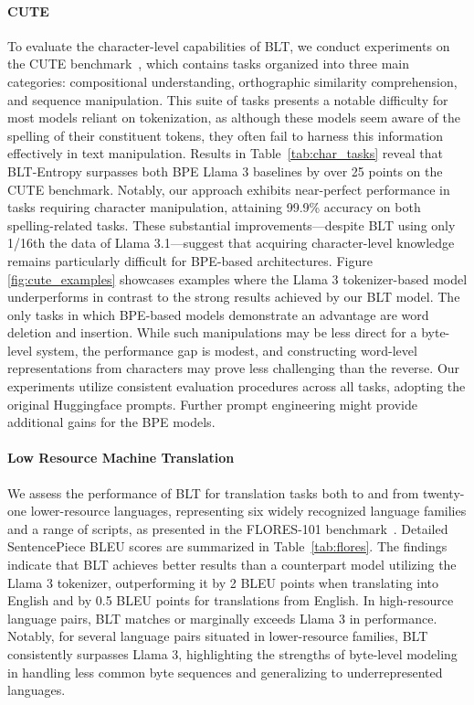 \paragraph{CUTE}
To evaluate the character-level capabilities of {\textsc BLT}, we conduct experiments on the CUTE benchmark~\citep{edman2024cute}, which contains tasks organized into three main categories: compositional understanding, orthographic similarity comprehension, and sequence manipulation. This suite of tasks presents a notable difficulty for most models reliant on tokenization, as although these models seem aware of the spelling of their constituent tokens, they often fail to harness this information effectively in text manipulation. Results in Table~\ref{tab:char_tasks} reveal that {\textsc BLT}-Entropy surpasses both BPE Llama 3 baselines by over 25 points on the CUTE benchmark. Notably, our approach exhibits near-perfect performance in tasks requiring character manipulation, attaining 99.9\% accuracy on both spelling-related tasks. These substantial improvements—despite {\textsc BLT} using only 1/16th the data of Llama 3.1—suggest that acquiring character-level knowledge remains particularly difficult for BPE-based architectures. Figure \ref{fig:cute_examples} showcases examples where the Llama 3 tokenizer-based model underperforms in contrast to the strong results achieved by our {\textsc BLT} model. The only tasks in which BPE-based models demonstrate an advantage are word deletion and insertion. While such manipulations may be less direct for a byte-level system, the performance gap is modest, and constructing word-level representations from characters may prove less challenging than the reverse. Our experiments utilize consistent evaluation procedures across all tasks, adopting the original Huggingface prompts. Further prompt engineering might provide additional gains for the BPE models.

\paragraph{Low Resource Machine Translation} We assess the performance of {\textsc BLT} for translation tasks both to and from twenty-one lower-resource languages, representing six widely recognized language families and a range of scripts, as presented in the FLORES-101 benchmark~\citep{goyal2022flores}. Detailed SentencePiece BLEU scores are summarized in Table~\ref{tab:flores}. The findings indicate that {\textsc BLT} achieves better results than a counterpart model utilizing the Llama 3 tokenizer, outperforming it by 2 BLEU points when translating into English and by 0.5 BLEU points for translations from English. In high-resource language pairs, {\textsc BLT} matches or marginally exceeds Llama 3 in performance. Notably, for several language pairs situated in lower-resource families, {\textsc BLT} consistently surpasses Llama 3, highlighting the strengths of byte-level modeling in handling less common byte sequences and generalizing to underrepresented languages.


